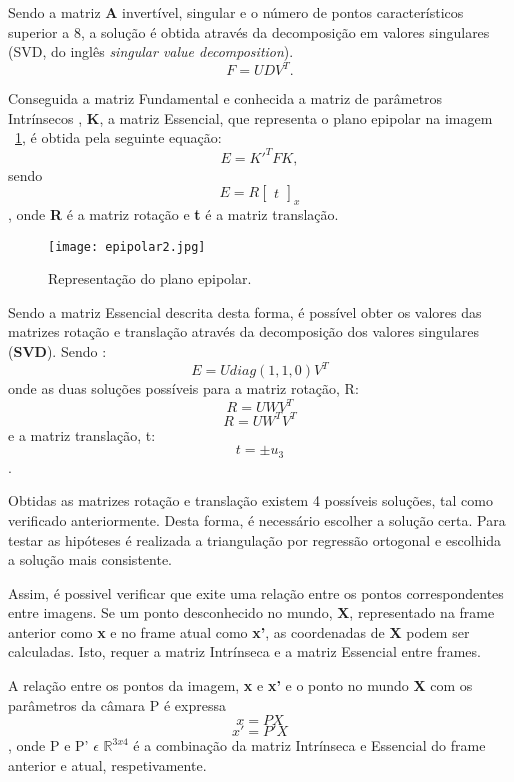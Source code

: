 Sendo a matriz \textbf{A} invertível, singular  e o número de pontos característicos superior a 8, a solução é obtida através da decomposição em valores singulares (SVD, do inglês \textit{singular value decomposition}).  \[ F = U D V^{T}.\]


Conseguida a matriz Fundamental e conhecida a matriz de parâmetros Intrínsecos , \textbf{K}, a matriz Essencial, que representa o plano epipolar na imagem ~\ref{fig:esseciallinemat}, é obtida pela seguinte equação:
\[ E = {K}'^{T} F K, \]  sendo \[ E = R \left[\begin{array}{c}
t
\end{array}\right]_{x} \], onde \textbf{R} é a matriz rotação e \textbf{t} é a matriz translação.

\begin{figure}[h!] %
	\begin{center}
		\leavevmode		
		\texttt{[image: epipolar2.jpg]}
		\caption{Representação do plano epipolar.}
		\label{fig:esseciallinemat}
	\end{center}
\end{figure}

Sendo a matriz Essencial descrita desta forma, é possível obter os valores das matrizes rotação e translação através da decomposição dos valores singulares (\textbf{SVD}). Sendo : \[ E = U diag(1,1,0) V^{T} \] onde as duas soluções possíveis para a matriz rotação, R: \[ R = UWV^T \] \[ R = UW^TV^T \] e a matriz translação, t: \[ t = \pm u_3 \].


Obtidas as matrizes rotação e translação existem 4 possíveis soluções, tal como verificado anteriormente. Desta forma, é necessário escolher a solução certa. Para testar as hipóteses é realizada a triangulação por regressão ortogonal e escolhida a solução mais consistente.

Assim, é possivel verificar que exite uma relação entre os pontos correspondentes entre imagens. Se um ponto desconhecido no mundo, \textbf{X}, representado na frame anterior como \textbf{x} e no frame atual como \textbf{x'}, as coordenadas de \textbf{X} podem ser calculadas. Isto, requer a matriz Intrínseca e a matriz Essencial entre frames.

A relação entre os pontos da imagem, \textbf{x} e \textbf{x'} e o ponto no mundo \textbf{X} com os parâmetros da câmara P é expressa \[ x = P X \] \[ x' = P'X \], onde P e P' $\epsilon$  $\mathbb{R}^{3x4}$ é a combinação da matriz Intrínseca e Essencial do frame anterior e atual, respetivamente.

